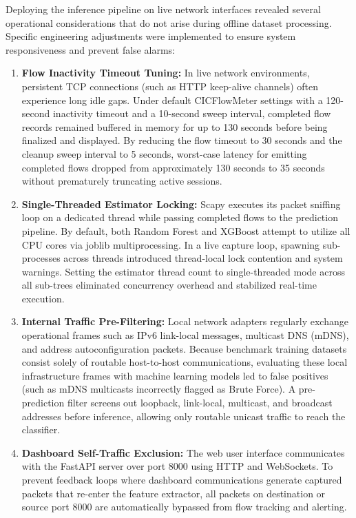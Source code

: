 \documentclass[12pt,a4paper]{report}
\begin{document}
Deploying the inference pipeline on live network interfaces revealed several operational considerations that do not arise during offline dataset processing. Specific engineering adjustments were implemented to ensure system responsiveness and prevent false alarms:

\begin{enumerate}
    \item \textbf{Flow Inactivity Timeout Tuning:} In live network environments, persistent TCP connections (such as HTTP keep-alive channels) often experience long idle gaps. Under default CICFlowMeter settings with a 120-second inactivity timeout and a 10-second sweep interval, completed flow records remained buffered in memory for up to 130 seconds before being finalized and displayed. By reducing the flow timeout to 30 seconds and the cleanup sweep interval to 5 seconds, worst-case latency for emitting completed flows dropped from approximately 130 seconds to 35 seconds without prematurely truncating active sessions.
    \item \textbf{Single-Threaded Estimator Locking:} Scapy executes its packet sniffing loop on a dedicated thread while passing completed flows to the prediction pipeline. By default, both Random Forest and XGBoost attempt to utilize all CPU cores via joblib multiprocessing. In a live capture loop, spawning sub-processes across threads introduced thread-local lock contention and system warnings. Setting the estimator thread count to single-threaded mode across all sub-trees eliminated concurrency overhead and stabilized real-time execution.
    \item \textbf{Internal Traffic Pre-Filtering:} Local network adapters regularly exchange operational frames such as IPv6 link-local messages, multicast DNS (mDNS), and address autoconfiguration packets. Because benchmark training datasets consist solely of routable host-to-host communications, evaluating these local infrastructure frames with machine learning models led to false positives (such as mDNS multicasts incorrectly flagged as Brute Force). A pre-prediction filter screens out loopback, link-local, multicast, and broadcast addresses before inference, allowing only routable unicast traffic to reach the classifier.
    \item \textbf{Dashboard Self-Traffic Exclusion:} The web user interface communicates with the FastAPI server over port 8000 using HTTP and WebSockets. To prevent feedback loops where dashboard communications generate captured packets that re-enter the feature extractor, all packets on destination or source port 8000 are automatically bypassed from flow tracking and alerting.
\end{enumerate}
\end{document}

